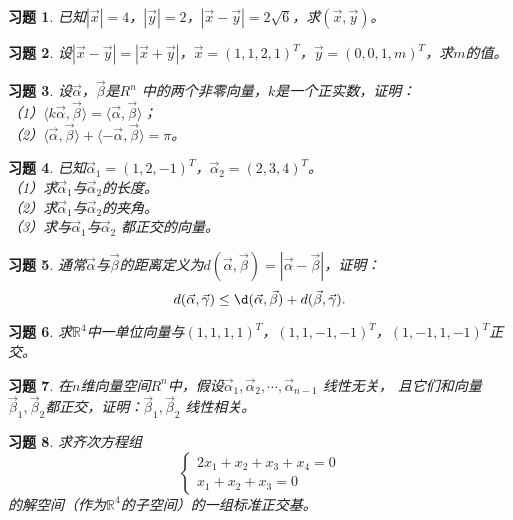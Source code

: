 \documentclass[a4paper]{book}
\newtheorem{ex}{习题}[chapter]
\begin{document}
\begin{ex}\label{6.5}
已知$|\vec{x}|=4$，$|\vec{y}|=2$，$|\vec{x}-\vec{y}|=2\sqrt{6}$，求$(\vec{x},\vec{y})$。
\end{ex}

\begin{ex}\label{6.6}
设$|\vec{x}-\vec{y}|=|\vec{x}+\vec{y}|$，$\vec{x}=(1,1,2,1)^T$，$\vec{y}=(0,0,1,m)^T$，求$m$的值。
\end{ex}

\begin{ex}\label{6.7}
设$\vec{\alpha}$，$\vec{\beta}$是$R^n$ 中的两个非零向量，$k$是一个正实数，证明：\\
（1）$\langle k\vec{\alpha},\vec{\beta}\rangle=\langle\vec{\alpha},\vec{\beta}\rangle$；\\
（2）$\langle\vec{\alpha},\vec{\beta}\rangle+\langle-\vec{\alpha},\vec{\beta}\rangle=\pi$。
\end{ex}

\begin{ex}\label{6.8}
已知$\vec{\alpha}_1=(1,2,-1)^T$，$\vec{\alpha}_2=(2,3,4)^T$。\\
（1）求$\vec{\alpha}_1$与$\vec{\alpha}_2$的长度。\\
（2）求$\vec{\alpha}_1$与$\vec{\alpha}_2$的夹角。\\
（3）求与$\vec{\alpha}_1$与$\vec{\alpha}_2$ 都正交的向量。
\end{ex}

\begin{ex}\label{6.9}
通常$\vec{\alpha}$与$\vec{\beta}$的距离定义为$d(\vec{\alpha},\vec{\beta})=|\vec{\alpha}-\vec{\beta}|$，证明：
\begin{equation*}
d(\vec{\alpha},\vec{\gamma})\leq\d(\vec{\alpha},\vec{\beta})+d(\vec{\beta},\vec{\gamma}).
\end{equation*}
\end{ex}

\begin{ex}\label{6.10}
求$\mathbb{R}^4$中一单位向量与$(1,1,1,1)^T$，$(1,1,-1,-1)^T$，$(1,-1,1,-1)^T$正交。
\end{ex}

\begin{ex}\label{6.11}
在$n$维向量空间$R^{n}$中，假设$\vec{\alpha}_1,\vec{\alpha}_2,\cdots,\vec{\alpha}_{n-1}$ 线性无关，
且它们和向量$\vec{\beta}_1,\vec{\beta}_2$都正交，证明：$\vec{\beta}_1,\vec{\beta}_2$ 线性相关。\\
\end{ex}

\begin{ex}\label{6.12}
求齐次方程组
\begin{equation*}
  \begin{cases}
  2x_1+x_2+x_3+x_4=0\\
  x_1+x_2+x_3=0
  \end{cases}
\end{equation*}
的解空间（作为$\mathbb{R}^4$的子空间）的一组标准正交基。
\end{ex}
\end{document}
